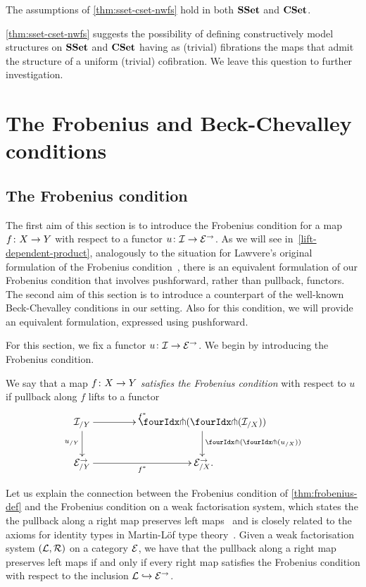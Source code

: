 \documentclass[reqno,10pt,a4paper,oneside,draft]{amsart}
\begin{document}
\begin{example} The assumptions of \cref{thm:sset-cset-nwfs} hold in both $\SSet$ and $\CSet$. 
\end{example} 

\cref{thm:sset-cset-nwfs} suggests the possibility of defining constructively model structures on $\SSet$ and $\CSet$ having as (trivial) fibrations the maps that admit the structure of a uniform (trivial) cofibration.
We leave this question to further investigation.


\section{The Frobenius and Beck-Chevalley conditions}
\label{sec:frobc}



\subsection*{The Frobenius condition}

The first aim of this section is to introduce the Frobenius condition for a map $f \co X \to Y$ with respect to a functor $u \co \cal{I} \to \catE^\to$.
As we will see in~\cref{lift-dependent-product}, analogously to the situation for Lawvere's original formulation of the Frobenius condition~\cite{lawvere-equality}, there is an equivalent formulation of our Frobenius condition that involves pushforward, rather than pullback, functors.
The second aim of this section is to introduce a counterpart of the well-known Beck-Chevalley conditions in our setting.
Also for this condition, we will provide an equivalent formulation, expressed using pushforward.

For this section, we fix a functor $u \co \cal{I} \to \catE^\to$.
We begin by introducing the Frobenius condition.

\begin{definition} \label{thm:frobenius-def}
We say that a map $f \co X \to Y$ \emph{satisfies the Frobenius condition} with respect to $u$ if pullback along $f$ lifts to a functor
\[
\xymatrix@C=1.5cm{
  \cal{I}_{/Y}
  \ar[r]^{f^*}
  \ar[d]_{u_{/Y}}
&
  \liftl{(\liftr{(\cal{I}_{/X})})}
  \ar[d]^{\liftl{(\liftr{(u_{/X})})}}
\\
  \catE_{/Y}^\to \ar[r]_{f^*}
&
  \catE_{/X}^\to
\rlap{.}}
\]
\end{definition}

Let us explain the connection between the Frobenius condition of \cref{thm:frobenius-def} and the Frobenius condition on a weak factorisation system, which states the the pullback along a right map preserves left maps~\cite{garner:types-omega-groupoids,garner:topological-simplicial} and is closely related to the axioms for identity types in Martin-L\"of type 
theory~\cite{gambino-garner:idtypewfs}.
Given a weak factorisation system $(\cal{L}, \cal{R})$ on a category $\catE$, we have that the pullback along a right map preserves left maps if and only if every right map satisfies the Frobenius condition with respect to the inclusion $\cal{L} \hookrightarrow \catE^\to$.
\end{document}
